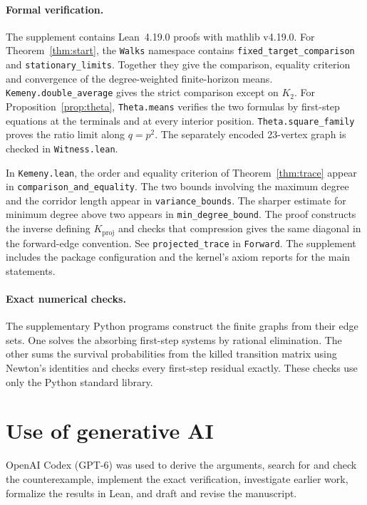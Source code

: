 \documentclass[11pt]{article}
\newcommand{\kp}{K_{\mathrm{proj}}}
\begin{document}
\paragraph{Formal verification.}
The supplement contains Lean~4.19.0 proofs with mathlib v4.19.0.
For Theorem~\ref{thm:start}, the \texttt{Walks} namespace contains
\texttt{fixed\_target\_comparison} and \texttt{stationary\_limits}.
Together they give the comparison, equality
criterion and convergence of the degree-weighted finite-horizon means.
\texttt{Kemeny.double\_average} gives the strict comparison except on
$K_2$. For Proposition~\ref{prop:theta}, \texttt{Theta.means} verifies
the two formulas by first-step equations at the terminals and at every
interior position. \texttt{Theta.square\_family} proves the ratio limit
along $q=p^2$. The separately encoded 23-vertex graph is checked in
\texttt{Witness.lean}.

In \texttt{Kemeny.lean}, the order and equality criterion of
Theorem~\ref{thm:trace} appear in \texttt{comparison\_\allowbreak and\_\allowbreak equality}.
The two bounds involving the maximum degree and the corridor length appear
in \texttt{variance\_\allowbreak bounds}. The sharper estimate for minimum degree
above two appears in \texttt{min\_\allowbreak degree\_\allowbreak bound}. The proof constructs the inverse defining
$\kp$ and checks that compression gives the same diagonal in the
forward-edge convention. See \texttt{projected\_trace} in \texttt{Forward}.
The supplement includes the package configuration and the kernel's
axiom reports for the main statements.

\paragraph{Exact numerical checks.}
The supplementary Python programs construct the finite graphs from their
edge sets. One solves the absorbing first-step systems by rational
elimination. The other sums the survival probabilities from the killed
transition matrix using Newton's identities and checks every first-step
residual exactly. These checks use only the Python standard library.

\section*{Use of generative AI}
OpenAI Codex (GPT-6) was used to derive the arguments, search for and check
the counterexample, implement the exact verification, investigate earlier
work, formalize the results in Lean, and draft and revise the manuscript.
\end{document}

